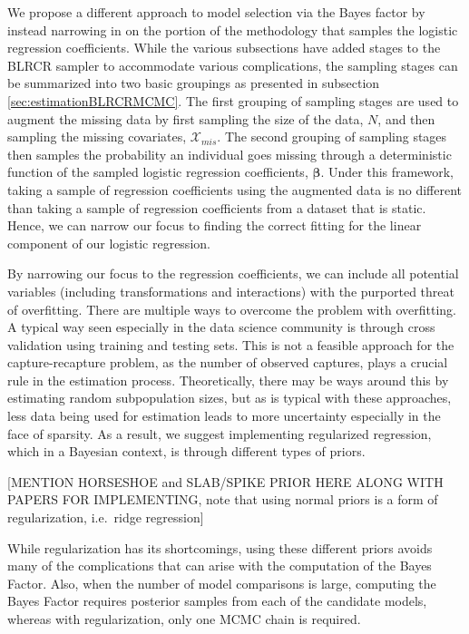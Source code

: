\documentclass[
  12pt,
]{article}
\begin{document}
We propose a different approach to model selection via the Bayes factor
by instead narrowing in on the portion of the methodology that samples
the logistic regression coefficients. While the various subsections have
added stages to the BLRCR sampler to accommodate various complications,
the sampling stages can be summarized into two basic groupings as
presented in subsection \ref{sec:estimationBLRCRMCMC}. The first
grouping of sampling stages are used to augment the missing data by
first sampling the size of the data, \(N\), and then sampling the
missing covariates, \(\mathcal{X}_{mis}\). The second grouping of
sampling stages then samples the probability an individual goes missing
through a deterministic function of the sampled logistic regression
coefficients, \(\boldsymbol{\beta}\). Under this framework, taking a
sample of regression coefficients using the augmented data is no
different than taking a sample of regression coefficients from a dataset
that is static. Hence, we can narrow our focus to finding the correct
fitting for the linear component of our logistic regression.

By narrowing our focus to the regression coefficients, we can include
all potential variables (including transformations and interactions)
with the purported threat of overfitting. There are multiple ways to
overcome the problem with overfitting. A typical way seen especially in
the data science community is through cross validation using training
and testing sets. This is not a feasible approach for the
capture-recapture problem, as the number of observed captures, plays a
crucial rule in the estimation process. Theoretically, there may be ways
around this by estimating random subpopulation sizes, but as is typical
with these approaches, less data being used for estimation leads to more
uncertainty especially in the face of sparsity. As a result, we suggest
implementing regularized regression, which in a Bayesian context, is
through different types of priors.

{[}MENTION HORSESHOE and SLAB/SPIKE PRIOR HERE ALONG WITH PAPERS FOR
IMPLEMENTING, note that using normal priors is a form of regularization,
i.e.~ridge regression{]}

While regularization has its shortcomings, using these different priors
avoids many of the complications that can arise with the computation of
the Bayes Factor. Also, when the number of model comparisons is large,
computing the Bayes Factor requires posterior samples from each of the
candidate models, whereas with regularization, only one MCMC chain is
required.
\end{document}
